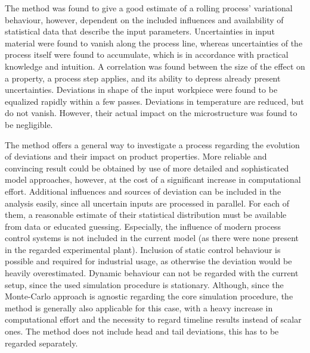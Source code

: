 \documentclass[DIV=13]{scrartcl}
\begin{document}
    The method was found to give a good estimate of a rolling process' variational behaviour, however, dependent on the included influences and availability of statistical data that describe the input parameters.
    Uncertainties in input material were found to vanish along the process line, whereas uncertainties of the process itself were found to accumulate, which is in accordance with practical knowledge and intuition.
    A correlation was found between the size of the effect on a property, a process step applies, and its ability to depress already present uncertainties.
    Deviations in shape of the input workpiece were found to be equalized rapidly within a few passes.
    Deviations in temperature are reduced, but do not vanish.
    However, their actual impact on the microstructure was found to be negligible.

    The method offers a general way to investigate a process regarding the evolution of deviations and their impact on product properties.
    More reliable and convincing result could be obtained by use of more detailed and sophisticated model approaches, however, at the cost of a significant increase in computational effort.
    Additional influences and sources of deviation can be included in the analysis easily, since all uncertain inputs are processed in parallel.
    For each of them, a reasonable estimate of their statistical distribution must be available from data or educated guessing.
    Especially, the influence of modern process control systems is not included in the current model (as there were none present in the regarded experimental plant).
    Inclusion of static control behaviour is possible and required for industrial usage, as otherwise the deviation would be heavily overestimated.
    Dynamic behaviour can not be regarded with the current setup, since the used simulation procedure is stationary.
    Although, since the Monte-Carlo approach is agnostic regarding the core simulation procedure, the method is generally also applicable for this case, with a heavy increase in computational effort and the necessity to regard timeline results instead of scalar ones.
    The method does not include head and tail deviations, this has to be regarded separately.

    

    \printbibliography
\end{document}
